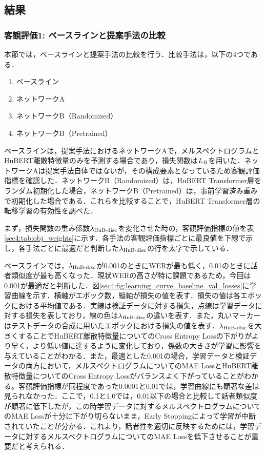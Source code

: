 \subsection{結果}
\subsubsection{客観評価1: ベースラインと提案手法の比較}
\label{sec4:sec:obj_1}
本節では，ベースラインと提案手法の比較を行う．比較手法は，以下の4つである．
\begin{enumerate}
    \item ベースライン
    \item ネットワークA
    \item ネットワークB（Randomized）
    \item ネットワークB（Pretrained）
\end{enumerate}
ベースラインは，提案手法におけるネットワークAで，メルスペクトログラムとHuBERT離散特徴量のみを予測する場合であり，損失関数は$L_{B}$を用いた．ネットワークAは提案手法自体ではないが，その構成要素となっているため客観評価指標を確認した．ネットワークB（Randomized）は，HuBERT Transformer層をランダム初期化した場合，ネットワークB（Pretrained）は，事前学習済み重みで初期化した場合である．これらを比較することで，HuBERT Transformer層の転移学習の有効性を調べた．

まず，損失関数の重み係数$\lambda_{\text{HuB-disc}}$を変化させた時の，客観評価指標の値を表\ref{sec4:tab:obj_weights}に示す．各手法の客観評価指標ごとに最良値を下線で示し，各手法ごとに最適だと判断した$\lambda_{\text{HuB-disc}}$の行を太字で示している．

ベースラインでは，$\lambda_{\text{HuB-disc}}$が0.001のときにWERが最も低く，0.01のときに話者類似度が最も高くなった．現状WERの高さが特に課題であるため，今回は0.001が最適だと判断した．図\ref{sec4:fig:learning_curve_baseline_val_losses}に学習曲線を示す．横軸がエポック数，縦軸が損失の値を表す．損失の値は各エポックにおける平均値である．実線は検証データに対する損失，点線は学習データに対する損失を表しており，線の色は$\lambda_{\text{HuB-disc}}$の違いを表す．また，丸いマーカーはテストデータの合成に用いたエポックにおける損失の値を表す．$\lambda_{\text{HuB-disc}}$を大きくすることでHuBERT離散特徴量についてのCross Entropy Lossの下がりがより早く，より低い値に達するように変化しており，係数の大きさが学習に影響を与えていることがわかる．また，最適とした0.001の場合，学習データと検証データの両方において，メルスペクトログラムについてのMAE LossとHuBERT離散特徴量についてのCross Entropy Lossがバランスよく下がっていることがわかる。客観評価指標が同程度であった0.0001と0.01では，学習曲線にも顕著な差は見られなかった．ここで，0.1と1.0では，0.01以下の場合と比較して話者類似度が顕著に低下したが，この時学習データに対するメルスペクトログラムについてのMAE Lossが十分に下がり切らないまま，Early Stoppingによって学習が中断されていたことが分かる．これより，話者性を適切に反映するためには，学習データに対するメルスペクトログラムについてのMAE Lossを低下させることが重要だと考えられる．

